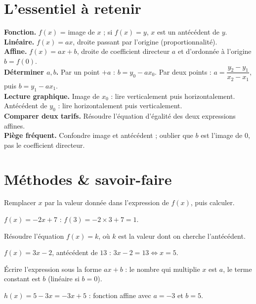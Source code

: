 \section{L'essentiel à retenir}

\begin{synthese}
\textbf{Fonction.} $f(x)$ = image de $x$ ; si $f(x)=y$, $x$ est un antécédent de $y$.\\[4pt]
\textbf{Linéaire.} $f(x)=ax$, droite passant par l'origine (proportionnalité).\\[4pt]
\textbf{Affine.} $f(x)=ax+b$, droite de coefficient directeur $a$ et d'ordonnée à l'origine
$b=f(0)$.\\[4pt]
\textbf{Déterminer $a,b$.} Par un point $+a$ : $b=y_0-ax_0$. Par deux points :
$a=\dfrac{y_2-y_1}{x_2-x_1}$, puis $b=y_1-ax_1$.\\[4pt]
\textbf{Lecture graphique.} Image de $x_0$ : lire verticalement puis horizontalement.
Antécédent de $y_0$ : lire horizontalement puis verticalement.\\[4pt]
\textbf{Comparer deux tarifs.} Résoudre l'équation d'égalité des deux expressions affines.\\[4pt]
\textbf{Piège fréquent.} Confondre image et antécédent ; oublier que $b$ est l'image de
$0$, pas le coefficient directeur.
\end{synthese}

\section{Méthodes \& savoir-faire}

Remplacer $x$ par la valeur donnée dans l'expression de $f(x)$, puis calculer.
\begin{exemple}
$f(x)=-2x+7$ : $f(3)=-2\times3+7=1$.
\end{exemple}

Résoudre l'équation $f(x)=k$, où $k$ est la valeur dont on cherche l'antécédent.
\begin{exemple}
$f(x)=3x-2$, antécédent de $13$ : $3x-2=13\iff x=5$.
\end{exemple}

Écrire l'expression sous la forme $ax+b$ : le nombre qui multiplie $x$ est $a$, le terme
constant est $b$ (linéaire si $b=0$).
\begin{exemple}
$h(x)=5-3x=-3x+5$ : fonction affine avec $a=-3$ et $b=5$.
\end{exemple}

